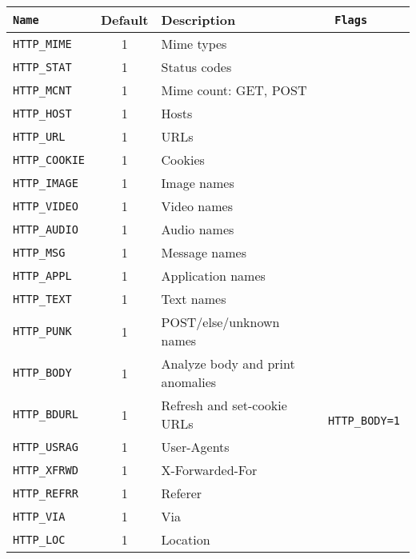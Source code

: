 \documentclass[documentation]{subfiles}
\begin{document}
\begin{longtable}{>{\tt}lcl>{\tt\small}l}
    \toprule
    {\bf Name} & {\bf Default} & {\bf Description} & {\bf Flags}\\
    \midrule\endhead%
    HTTP\_MIME           & 1 & Mime types                                      & \\
    HTTP\_STAT           & 1 & Status codes                                    & \\
    HTTP\_MCNT           & 1 & Mime count: GET, POST                           & \\
    HTTP\_HOST           & 1 & Hosts                                           & \\
    HTTP\_URL            & 1 & URLs                                            & \\
    HTTP\_COOKIE         & 1 & Cookies                                         & \\
    HTTP\_IMAGE          & 1 & Image names                                     & \\
    HTTP\_VIDEO          & 1 & Video names                                     & \\
    HTTP\_AUDIO          & 1 & Audio names                                     & \\
    HTTP\_MSG            & 1 & Message names                                   & \\
    HTTP\_APPL           & 1 & Application names                               & \\
    HTTP\_TEXT           & 1 & Text names                                      & \\
    HTTP\_PUNK           & 1 & POST/else/unknown names                         & \\
    HTTP\_BODY           & 1 & Analyze body and print anomalies                & \\
    HTTP\_BDURL          & 1 & Refresh and set-cookie URLs                     & HTTP\_BODY=1\\
    HTTP\_USRAG          & 1 & User-Agents                                     & \\
    HTTP\_XFRWD          & 1 & X-Forwarded-For                                 & \\
    HTTP\_REFRR          & 1 & Referer                                         & \\
    HTTP\_VIA            & 1 & Via                                             & \\
    HTTP\_LOC            & 1 & Location                                        & \\

\end{longtable}
\end{document}
